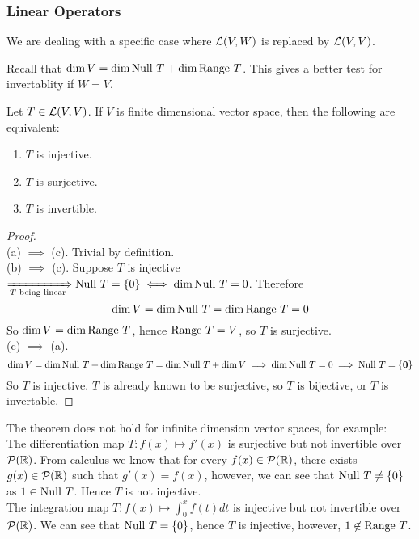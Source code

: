 \subsubsection{Linear Operators}
We are dealing with a specific case where $\mathcal L(V,W)$ is replaced by $\mathcal L(V,V)$.
\begin{center}
\end{center}
Recall that $\dim V = \dim \text{Null } T + \dim \text{Range } T$. This gives a better test for invertablity if $W  = V$. 
\begin{theorem}
    Let $T \in \mathcal L(V,V)$. If $V$ is finite dimensional vector space, then the following are equivalent: 
    \begin{enumerate}[label = (\alph*)]
        \item $T$ is injective.
        \item $T$ is surjective.
        \item $T$ is invertible.
    \end{enumerate}
\end{theorem}
\begin{proof} $ $ \\
    (a) $\implies$ (c). Trivial by definition. \\
    (b) $\implies$ (c). Suppose $T$ is injective $\xRightarrow[T \text{ being linear}]{} \text{Null } T = \left\{ 0 \right\} \iff \dim \text{Null } T = 0$. Therefore 
    \[ \dim V = \dim \text{Null } T = \dim \text{Range } T = 0\] So $\dim V = \dim \text{Range } T$, hence $\text{Range } T = V$, so $T$ is surjective. \\
    (c) $\implies$ (a).  \[\dim V = \dim \text{Null } T + \dim \text{Range } T = \dim \text{Null } T + \dim V \implies \dim \text{Null } T  = 0 \implies \text{Null } T = \left\{ \mathbf 0 \right\}\] So $T$ is injective. $T$ is already known to be surjective, so $T$ is bijective, or $T$ is invertable.
\end{proof}
\begin{example}
    The theorem does not hold for infinite dimension vector spaces, for example: \\ 
    The differentiation map $T : f(x) \mapsto f'(x)$ is surjective but not invertible over $\mathcal P(\mathbb R)$.  From calculus we know that for every $f(x) \in \mathcal P(\mathbb R)$, there exists $g(x) \in \mathcal P(\mathbb R)$ such that $g'(x) = f(x)$, however, we can see that $\text{Null } T \neq \left\{ 0 \right\}$ as $1 \in
    \text{Null } T$. Hence $T$ is not injective. \\
    The integration map $\displaystyle T: f(x) \mapsto \int_0^x f(t) dt$ is injective but not invertible over $\mathcal P(\mathbb R)$. We can see that $\text{Null } T = \left\{ 0 \right\}$, hence $T$ is injective, however, $1 \not\in \text{Range } T$.
\end{example}
